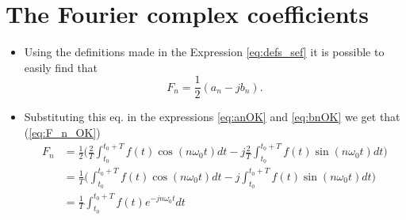 \section{The Fourier complex coefficients}
\begin{itemize}
\item Using the definitions made in the Expression \ref{eq:defs_sef}
  it is possible to easily find that
  \begin{equation}
    F_n = \frac{1}{2}(a_n-jb_n).\tag{F\_n}
    \label{eq:F_n}
  \end{equation}
\item Substituting this eq. in the expressions \ref{eq:anOK} and
  \ref{eq:bnOK} we get that (\ref{eq:F_n_OK})
  \begin{equation}
  \begin{array}{rl}
    F_n & = \displaystyle\frac{1}{2}\Big(\frac{2}{T}\int_{t_0}^{t_0+T}
    f(t)\cos(n\omega_0t)dt -j\frac{2}{T}\int_{t_0}^{t_0+T} f(t)\sin(n\omega_0t)dt
  \Big)\\
   & = \displaystyle\frac{1}{T}\Big(\int_{t_0}^{t_0+T}
   f(t)\cos(n\omega_0t)dt -j\int_{t_0}^{t_0+T} f(t)\sin(n\omega_0t)dt\Big)\\
   & = \displaystyle\frac{1}{T}\int_{t_0}^{t_0+T}f(t)e^{-jn\omega_0t} dt
  \end{array}
  \tag{F\_n\_OK}
  \label{eq:F_n_OK}
  \end{equation}
\end{itemize}

